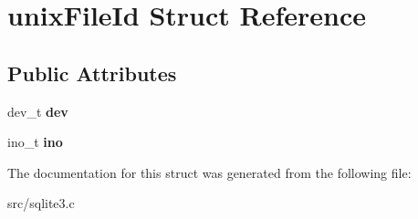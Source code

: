\hypertarget{structunix_file_id}{\section{unix\-File\-Id Struct Reference}
\label{structunix_file_id}
}
\subsection*{Public Attributes}
\begin{DoxyCompactItemize}
\item 
\hypertarget{structunix_file_id_acf703d95b9a1ae2f34affb7e9ae45e1b}{dev\-\_\-t {\bfseries dev}}\label{structunix_file_id_acf703d95b9a1ae2f34affb7e9ae45e1b}

\item 
\hypertarget{structunix_file_id_a2cc2d43e9d3f0a60810daa8fc353e692}{ino\-\_\-t {\bfseries ino}}\label{structunix_file_id_a2cc2d43e9d3f0a60810daa8fc353e692}

\end{DoxyCompactItemize}


The documentation for this struct was generated from the following file\-:\begin{DoxyCompactItemize}
\item 
src/sqlite3.\-c\end{DoxyCompactItemize}
